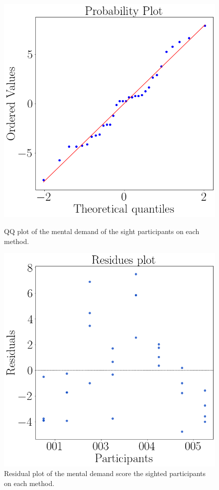 \begin{figure}[!htb]
    \centering
    \begin{minipage}{0.45\textwidth}
        \centering
        \includegraphics[width = 0.8\linewidth]{Resultados/Nasa/Figuras/png/qqplot_md_avg_two_way_sight.png}
        \caption{QQ plot of the mental demand of the sight participants on each method.}
        \label{fig:qqplot_md_avg_two_way_sight}
    \end{minipage}
    \begin{minipage}{0.45\textwidth}
        \centering
        \includegraphics[width = 0.8\linewidth]{Resultados/Nasa/Figuras/png/residplot_md_avg_two_way_sight.png}
        \caption{Residual plot of the mental demand score the sighted participants on each method.}
        \label{fig:residplot_md_avg_two_way_sight}
    \end{minipage}
\end{figure}

